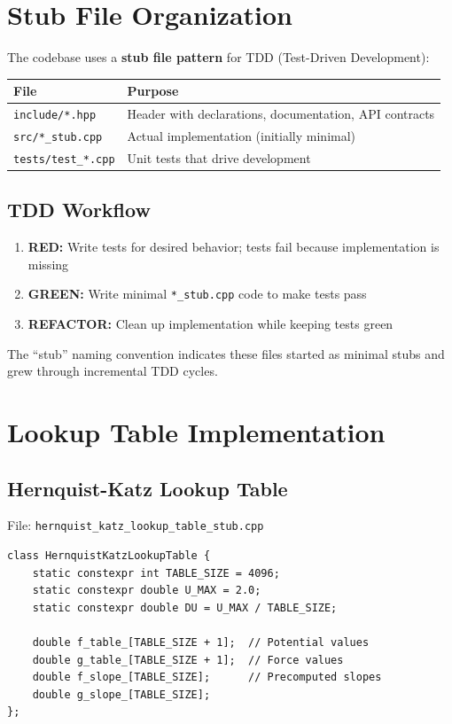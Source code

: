 \documentclass[12pt]{article}
\begin{document}
\section{Stub File Organization}

The codebase uses a \textbf{stub file pattern} for TDD (Test-Driven Development):

\begin{table}[h]
\centering
\begin{tabular}{ll}
\toprule
\textbf{File} & \textbf{Purpose} \\
\midrule
\texttt{include/*.hpp} & Header with declarations, documentation, API contracts \\
\texttt{src/*\_stub.cpp} & Actual implementation (initially minimal) \\
\texttt{tests/test\_*.cpp} & Unit tests that drive development \\
\bottomrule
\end{tabular}
\end{table}

\subsection{TDD Workflow}

\begin{enumerate}
\item \textbf{RED:} Write tests for desired behavior; tests fail because implementation is missing
\item \textbf{GREEN:} Write minimal \texttt{*\_stub.cpp} code to make tests pass
\item \textbf{REFACTOR:} Clean up implementation while keeping tests green
\end{enumerate}

The ``stub'' naming convention indicates these files started as minimal stubs and grew
through incremental TDD cycles.

\section{Lookup Table Implementation}

\subsection{Hernquist-Katz Lookup Table}

File: \texttt{hernquist\_katz\_lookup\_table\_stub.cpp}

\begin{verbatim}
class HernquistKatzLookupTable {
    static constexpr int TABLE_SIZE = 4096;
    static constexpr double U_MAX = 2.0;
    static constexpr double DU = U_MAX / TABLE_SIZE;

    double f_table_[TABLE_SIZE + 1];  // Potential values
    double g_table_[TABLE_SIZE + 1];  // Force values
    double f_slope_[TABLE_SIZE];      // Precomputed slopes
    double g_slope_[TABLE_SIZE];
};
\end{verbatim}
\end{document}
